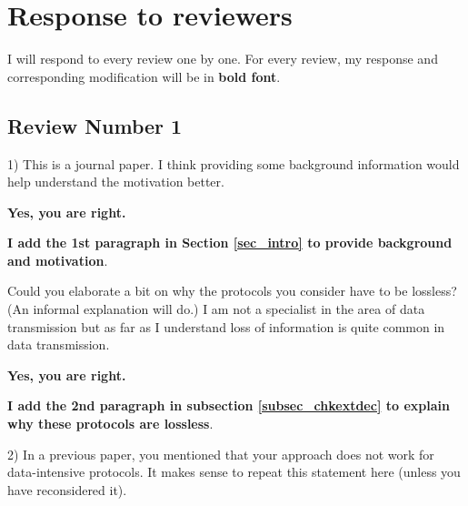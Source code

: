 \documentclass[journal]{IEEEtran}
\begin{document}




\section{Response to reviewers}
I will respond to every review one by one.
For every review,
my response and corresponding modification will be in \textbf{bold font}.

\subsection{Review Number 1}

1) This is a journal paper.  I think providing some background information would help understand the motivation better.

\smallskip
\textbf{Yes,
you are right.}

\textbf{I add the 1st paragraph in Section \ref{sec_intro} to provide background and motivation}.

\bigskip



Could you elaborate a bit on why the protocols  you consider have to be lossless? (An informal explanation will do.)
I am not a specialist in the area of data transmission but as far as I understand loss of information is quite common
in data transmission.

\smallskip
\textbf{Yes,
you are right.}

\textbf{I add the 2nd paragraph in subsection \ref{subsec_chkextdec} to explain why these protocols are lossless}.

\bigskip

2) In a previous paper, you mentioned that your approach does not work for data-intensive protocols.
It makes sense to repeat this statement here (unless you have reconsidered it).

\smallskip
\end{document}
